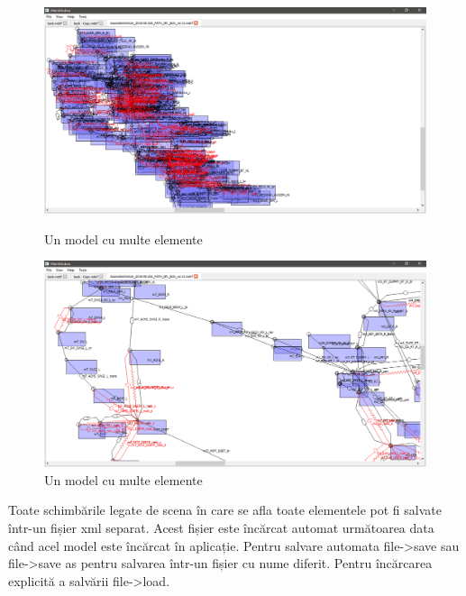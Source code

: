 \begin{figure}[H]
    \includegraphics[width=\linewidth]{imagini/implementare/bigmodel.png}
    \caption{Un model cu multe elemente}
    \label{fig:tabs}

    \includegraphics[width=\linewidth]{imagini/implementare/bigmodelzoom.png}
    \caption{Un model cu multe elemente}
    \label{fig:tabs}
\end{figure}

Toate schimbările legate de scena în care se afla toate elementele pot fi salvate 
într-un fișier xml separat. Acest fișier este încărcat automat următoarea data când acel model este încărcat în aplicație. 
Pentru salvare automata file->save sau file->save as pentru salvarea într-un fișier cu nume diferit. Pentru încărcarea explicită 
a salvării file->load. 